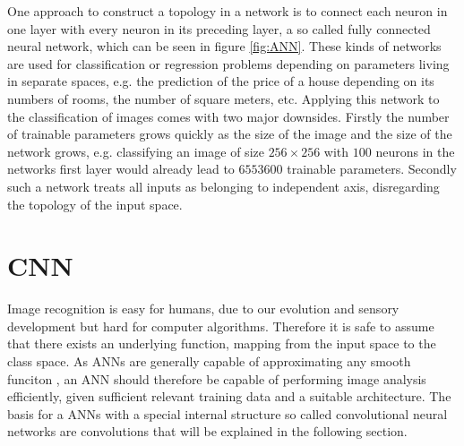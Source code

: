 One approach to construct a topology in a network is to connect each neuron in one layer with every neuron in its preceding layer, a so called fully connected neural network, which can be seen in figure \ref{fig:ANN}. These kinds of networks are used for classification or regression problems depending on parameters living in separate spaces, e.g. the prediction of the price of a house depending on its numbers of rooms, the number of square meters, etc. Applying this network to the classification of images comes with two major downsides. Firstly the number of trainable parameters grows quickly as the size of the image and the size of the network grows, e.g. classifying an image of size $256\times 256$ with $100$ neurons in the networks first layer would already lead to $6553600$ trainable parameters. Secondly such a network treats all inputs as belonging to independent axis, disregarding the topology of the input space.

\section{CNN}\label{sec:DiscreteConvolutions}
Image recognition is easy for humans, due to our evolution and sensory development but hard for computer algorithms. Therefore it is safe to assume that there exists an underlying function, mapping from the input space to the class space. As ANNs are generally capable of approximating any smooth funciton \cite{Hornik1989}, an ANN should therefore be capable of performing image analysis efficiently, given sufficient relevant training data and a suitable architecture. The basis for a ANNs with a special internal structure so called convolutional neural networks are convolutions that will be explained in the following section. \\




